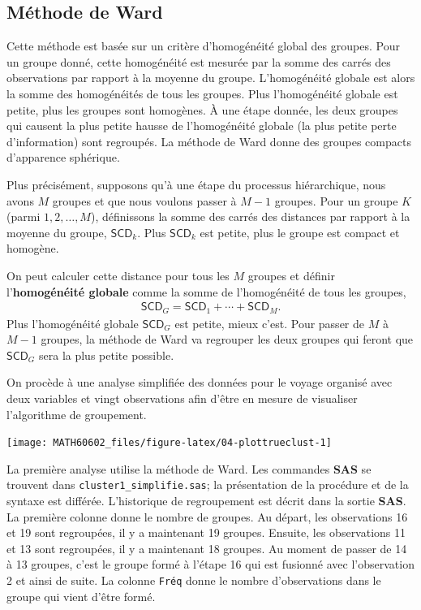 \documentclass[
  11pt,
  letterpaper,
]{book}
\theoremstyle{definition}
\theoremstyle{definition}
\theoremstyle{definition}
\theoremstyle{definition}
\theoremstyle{remark}
\begin{document}
\hypertarget{muxe9thode-de-ward}{%
\subsection{Méthode de Ward}\label{muxe9thode-de-ward}}

Cette méthode est basée sur un critère d'homogénéité global des groupes. Pour un groupe donné, cette homogénéité est mesurée par la somme des carrés des observations par rapport à la moyenne du groupe. L'homogénéité globale est alors la somme des homogénéités de tous les groupes. Plus l'homogénéité globale est petite, plus les groupes sont homogènes. À une étape donnée, les deux groupes qui causent la plus petite hausse de l'homogénéité globale (la plus petite perte d'information) sont regroupés. La méthode de Ward donne des groupes compacts d'apparence sphérique.

Plus précisément, supposons qu'à une étape du processus hiérarchique, nous avons \(M\) groupes et que nous voulons passer à \(M-1\) groupes. Pour un groupe \(K\) (parmi \(1, 2, \ldots, M\)), définissons la somme des carrés des distances par rapport à la moyenne du groupe, \(\mathsf{SCD}_k\). Plus \(\mathsf{SCD}_k\) est petite, plus le groupe est compact et homogène.

On peut calculer cette distance pour tous les \(M\) groupes et définir l'\textbf{homogénéité globale} comme la somme de l'homogénéité de tous les groupes,
\begin{align*}
\mathsf{SCD}_G = \mathsf{SCD}_1 + \cdots + \mathsf{SCD}_M.
\end{align*}
Plus l'homogénéité globale \(\mathsf{SCD}_G\) est petite, mieux c'est. Pour passer de \(M\) à \(M-1\) groupes, la méthode de Ward va regrouper les deux groupes qui feront que \(\mathsf{SCD}_G\) sera la plus petite possible.

On procède à une analyse simplifiée des données pour le voyage organisé avec deux variables et vingt observations afin d'être en mesure de visualiser l'algorithme de groupement.

\begin{center}\texttt{[image: MATH60602\_files/figure-latex/04-plottrueclust-1]} \end{center}

La première analyse utilise la méthode de Ward. Les commandes \textbf{SAS} se trouvent dans \texttt{cluster1\_simplifie.sas}; la présentation de la procédure et de la syntaxe est différée. L'historique de regroupement est décrit dans la sortie \textbf{SAS}. La première colonne donne le nombre de groupes. Au départ, les observations 16 et 19 sont regroupées, il y a maintenant 19 groupes. Ensuite, les observations 11 et 13 sont regroupées, il y a maintenant 18 groupes. Au moment de passer de 14 à 13 groupes, c'est le groupe formé à l'étape 16 qui est fusionné avec l'observation 2 et ainsi de suite. La colonne \texttt{Fréq} donne le nombre d'observations dans le groupe qui vient d'être formé.
\end{document}
